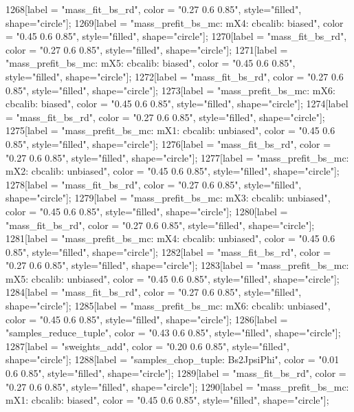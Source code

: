 {	1268[label = "mass_fit_bs_rd", color = "0.27 0.6 0.85", style="filled", shape="circle"];
	1269[label = "mass_prefit_bs_mc\nmassbin: mX4\nmassmodel: cbcalib\ntrigger: biased", color = "0.45 0.6 0.85", style="filled", shape="circle"];
	1270[label = "mass_fit_bs_rd", color = "0.27 0.6 0.85", style="filled", shape="circle"];
	1271[label = "mass_prefit_bs_mc\nmassbin: mX5\nmassmodel: cbcalib\ntrigger: biased", color = "0.45 0.6 0.85", style="filled", shape="circle"];
	1272[label = "mass_fit_bs_rd", color = "0.27 0.6 0.85", style="filled", shape="circle"];
	1273[label = "mass_prefit_bs_mc\nmassbin: mX6\nmassmodel: cbcalib\ntrigger: biased", color = "0.45 0.6 0.85", style="filled", shape="circle"];
	1274[label = "mass_fit_bs_rd", color = "0.27 0.6 0.85", style="filled", shape="circle"];
	1275[label = "mass_prefit_bs_mc\nmassbin: mX1\nmassmodel: cbcalib\ntrigger: unbiased", color = "0.45 0.6 0.85", style="filled", shape="circle"];
	1276[label = "mass_fit_bs_rd", color = "0.27 0.6 0.85", style="filled", shape="circle"];
	1277[label = "mass_prefit_bs_mc\nmassbin: mX2\nmassmodel: cbcalib\ntrigger: unbiased", color = "0.45 0.6 0.85", style="filled", shape="circle"];
	1278[label = "mass_fit_bs_rd", color = "0.27 0.6 0.85", style="filled", shape="circle"];
	1279[label = "mass_prefit_bs_mc\nmassbin: mX3\nmassmodel: cbcalib\ntrigger: unbiased", color = "0.45 0.6 0.85", style="filled", shape="circle"];
	1280[label = "mass_fit_bs_rd", color = "0.27 0.6 0.85", style="filled", shape="circle"];
	1281[label = "mass_prefit_bs_mc\nmassbin: mX4\nmassmodel: cbcalib\ntrigger: unbiased", color = "0.45 0.6 0.85", style="filled", shape="circle"];
	1282[label = "mass_fit_bs_rd", color = "0.27 0.6 0.85", style="filled", shape="circle"];
	1283[label = "mass_prefit_bs_mc\nmassbin: mX5\nmassmodel: cbcalib\ntrigger: unbiased", color = "0.45 0.6 0.85", style="filled", shape="circle"];
	1284[label = "mass_fit_bs_rd", color = "0.27 0.6 0.85", style="filled", shape="circle"];
	1285[label = "mass_prefit_bs_mc\nmassbin: mX6\nmassmodel: cbcalib\ntrigger: unbiased", color = "0.45 0.6 0.85", style="filled", shape="circle"];
	1286[label = "samples_reduce_tuple", color = "0.43 0.6 0.85", style="filled", shape="circle"];
	1287[label = "sweights_add", color = "0.20 0.6 0.85", style="filled", shape="circle"];
	1288[label = "samples_chop_tuple\nmode: Bs2JpsiPhi", color = "0.01 0.6 0.85", style="filled", shape="circle"];
	1289[label = "mass_fit_bs_rd", color = "0.27 0.6 0.85", style="filled", shape="circle"];
	1290[label = "mass_prefit_bs_mc\nmassbin: mX1\nmassmodel: cbcalib\ntrigger: biased", color = "0.45 0.6 0.85", style="filled", shape="circle"];
}
